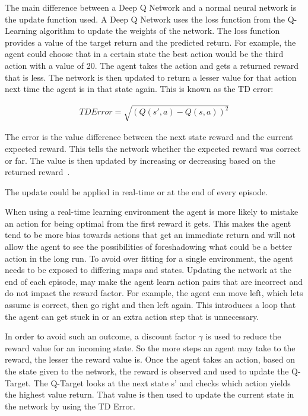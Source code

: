 The main difference between a Deep Q Network and a normal neural network is the
update function used. A Deep Q Network uses the loss function from the
Q-Learning algorithm to update the weights of the network. The loss function
provides a value of the target return and the predicted return. For example, the
agent could choose that in a certain state the best action would be the third
action with a value of 20. The agent takes the action and gets a returned reward
that is less. The network is then updated to return a lesser value for that
action next time the agent is in that state again. This is known as the TD
error:

\begin{align}
    TD Error = \sqrt{{(Q(s',a) - Q(s,a))}^{2}}
\end{align}

The error is the value difference between the next state reward and the current
expected reward. This tells the network whether the expected reward was correct
or far. The value is then updated by increasing or decreasing based on the
returned reward~\cite{pandey2010reinforcement}.

The update could be applied in real-time or at the end of every episode.

When using a real-time learning environment the agent is more likely to mistake
an action for being optimal from the first reward it gets. This makes the agent
tend to be more bias towards actions that get an immediate return and will not
allow the agent to see the possibilities of foreshadowing what could be a better
action in the long run. To avoid over fitting for a single environment, the
agent needs to be exposed to differing maps and states. Updating the network at
the end of each episode, may make the agent learn action pairs that are
incorrect and do not impact the reward factor. For example, the agent can move
left, which lets assume is correct, then go right and then left again. This
introduces a loop that the agent can get stuck in or an extra action step that
is unnecessary.

In order to avoid such an outcome, a discount factor $\gamma$ is used to reduce
the reward value for an incoming state. So the more steps an agent may take to
the reward, the lesser the reward value is. Once the agent takes an action,
based on the state given to the network, the reward is observed and used to
update the Q-Target. The Q-Target looks at the next state s' and checks which
action yields the highest value return. That value is then used to update the
current state in the network by using the TD Error.

